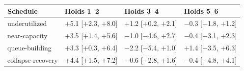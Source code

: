 \begin{tabular}{llll}
\toprule
Schedule & Holds 1--2 & Holds 3--4 & Holds 5--6 \\
\midrule
underutilized & $+$5.1 [$+$2.3, $+$8.0] & $+$1.2 [$+$0.2, $+$2.1] & $-$0.3 [$-$1.8, $+$1.2] \\
near-capacity & $+$3.5 [$+$1.4, $+$5.6] & $-$1.0 [$-$4.6, $+$2.7] & $-$0.4 [$-$3.1, $+$2.3] \\
queue-building & $+$3.3 [$+$0.3, $+$6.4] & $-$2.2 [$-$5.4, $+$1.0] & $+$1.4 [$-$3.5, $+$6.3] \\
collapse-recovery & $+$4.4 [$+$1.5, $+$7.2] & $-$0.6 [$-$2.8, $+$1.6] & $-$0.4 [$-$4.8, $+$4.1] \\
\bottomrule
\end{tabular}
